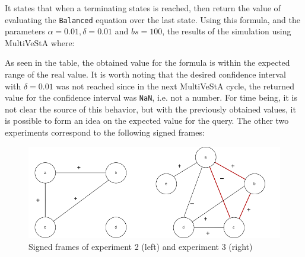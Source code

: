 It states that when a terminating states is reached, then return the value of evaluating the \texttt{Balanced} equation over the last state. Using this formula, and the parameters $\alpha = 0.01, \delta = 0.01$ and $bs = 100$, the results of the simulation using MultiVeStA where:

\begin{table}[H]
\centering
{}
\end{table}

As seen in the table, the obtained value for the formula is within the expected range of the real value. It is worth noting that the desired confidence interval with $\delta = 0.01$ was not reached since in the next MultiVeStA cycle, the returned value for the confidence interval was \texttt{NaN}, i.e. not a number. For time being, it is not clear the source of this behavior, but with the previously obtained values, it is possible to form an idea on the expected value for the query. The other two experiments correspond to the following signed frames:

\begin{figure}[H]
    \centering
    \includegraphics[scale = 0.5]{images/CS14.png}
    \caption{Signed frames of experiment 2 (left) and experiment 3 (right)}
    \label{fig:CS14}
\end{figure}

